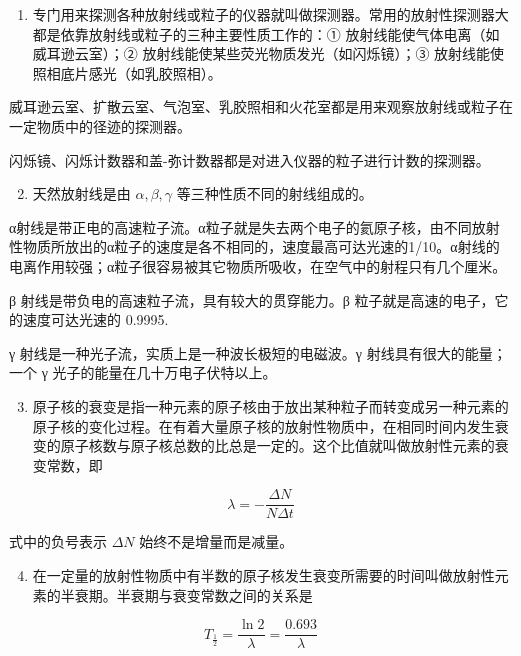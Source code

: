 \begin{enumerate}
\item
  专门用来探测各种放射线或粒子的仪器就叫做探测器。常用的放射性探测器大都是依靠放射线或粒子的三种主要性质工作的：①
  放射线能使气体电离（如威耳逊云室）；②
  放射线能使某些荧光物质发光（如闪烁镜）；③
  放射线能使照相底片感光（如乳胶照相）。
\end{enumerate}

威耳逊云室、扩散云室、气泡室、乳胶照相和火花室都是用来观察放射线或粒子在一定物质中的径迹的探测器。

闪烁镜、闪烁计数器和盖-弥计数器都是对进入仪器的粒子进行计数的探测器。

\begin{enumerate}
\setcounter{enumi}{1}
\item
  天然放射线是由 \(\alpha, \beta, \gamma\) 等三种性质不同的射线组成的。
\end{enumerate}

α射线是带正电的高速粒子流。α粒子就是失去两个电子的氦原子核，由不同放射性物质所放出的α粒子的速度是各不相同的，速度最高可达光速的1/10。α射线的电离作用较强；α粒子很容易被其它物质所吸收，在空气中的射程只有几个厘米。

β 射线是带负电的高速粒子流，具有较大的贯穿能力。β
粒子就是高速的电子，它的速度可达光速的 0.9995.

γ 射线是一种光子流，实质上是一种波长极短的电磁波。γ
射线具有很大的能量；一个 γ 光子的能量在几十万电子伏特以上。

\begin{enumerate}
\setcounter{enumi}{2}
\item
  原子核的衰变是指一种元素的原子核由于放出某种粒子而转变成另一种元素的原子核的变化过程。在有着大量原子核的放射性物质中，在相同时间内发生衰变的原子核数与原子核总数的比总是一定的。这个比值就叫做放射性元素的衰变常数，即
\end{enumerate}

\[
\lambda = - \frac {\Delta N}{N \Delta t}
\]

式中的负号表示 \(\Delta N\) 始终不是增量而是减量。

\begin{enumerate}
\setcounter{enumi}{3}
\item
  在一定量的放射性物质中有半数的原子核发生衰变所需要的时间叫做放射性元素的半衰期。半衰期与衰变常数之间的关系是
\end{enumerate}

\[
T _ {\frac {1}{2}} = \frac {\ln 2}{\lambda} = \frac {0.693}{\lambda}
\]

